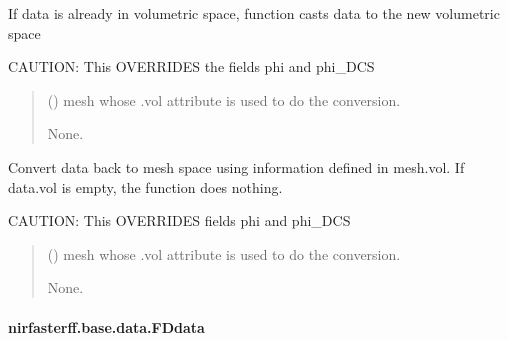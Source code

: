 \documentclass[letterpaper,10pt,english]{sphinxmanual}
\begin{document}
\begin{fulllineitems}
\begin{fulllineitems}
\sphinxAtStartPar
If data is already in volumetric space, function casts data to the new volumetric space

\sphinxAtStartPar
CAUTION: This OVERRIDES the fields phi and phi\_DCS
\begin{quote}\begin{description}
\sphinxAtStartPar
{} () \textendash{} mesh whose .vol attribute is used to do the conversion.

\sphinxAtStartPar
None.

\end{description}\end{quote}

\end{fulllineitems}


\begin{fulllineitems}
\label{\detokenize{_autosummary/nirfasterff.base.data.DCSdata:nirfasterff.base.data.DCSdata.tomesh}}
\pysigstartsignatures
\pysiglinewithargsret
{}
{}
{}
\pysigstopsignatures
\sphinxAtStartPar
Convert data back to mesh space using information defined in mesh.vol. If data.vol is empty, the function does nothing.

\sphinxAtStartPar
CAUTION: This OVERRIDES fields phi and phi\_DCS
\begin{quote}\begin{description}
\sphinxAtStartPar
{} () \textendash{} mesh whose .vol attribute is used to do the conversion.

\sphinxAtStartPar
None.

\end{description}\end{quote}

\end{fulllineitems}


\end{fulllineitems}


\sphinxstepscope


\paragraph{nirfasterff.base.data.FDdata}
\label{\detokenize{_autosummary/nirfasterff.base.data.FDdata:nirfasterff-base-data-fddata}}\label{\detokenize{_autosummary/nirfasterff.base.data.FDdata::doc}}
\end{document}
